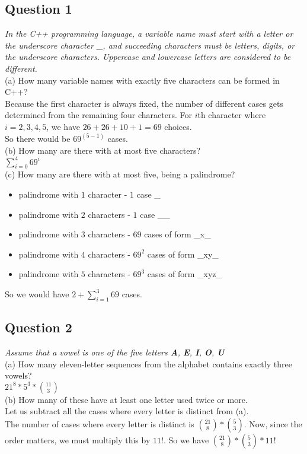 \documentclass{article}
\begin{document}
\subsection{Question 1}
\smallskip
\emph{In the C++ programming language, a variable name must start with a letter or the underscore character \_, and succeeding characters must be letters, digits, or the underscore characters. Uppercase and lowercase letters are considered to be different.}
\bigskip
\\
(a) How many variable names with exactly five characters can be formed in C++?
\medskip
\\
Because the first character is always fixed, the number of different cases gets determined from the remaining four characters. For $i$th character where $i=2,3,4,5$, we have $26+26+10+1 = 69$ choices.
\smallskip
\\
So there would be $69^{(5-1)}$ cases.
\bigskip
\\
(b) How many are there with at most five characters?
\medskip
\\
$\sum_{i=0}^4 69^i$
\bigskip
\\
(c) How many are there with at most five, being a palindrome?
\medskip
\begin{itemize}
    \item palindrome with $1$ character - $1$ case \_
    \item palindrome with $2$ characters - $1$ case \_\_
    \item palindrome with $3$ characters - $69$ cases of form  \_x\_
    \item palindrome with $4$ characters - $69^2$ cases of form \_xy\_
    \item palindrome with $5$ characters - $69^3$ cases of form \_xyz\_
\end{itemize}
So we would have $2 + \sum_{i=1}^3 69$ cases.
\smallskip
\\
\subsection{Question 2}
\smallskip
\emph{Assume that a vowel is one of the five letters \textbf{A}, \textbf{E}, \textbf{I}, \textbf{O}, \textbf{U}}
\bigskip
\\
(a) How many eleven-letter sequences from the alphabet contains exactly three vowels?
\medskip
\\
$21^8 * 5^3 * {11 \choose 3} $
\bigskip
\\
(b) How many of these have at least one letter used twice or more.
\medskip
\\
Let us subtract all the cases where every letter is distinct from (a).
\smallskip
\\
The number of cases where every letter is distinct is ${21\choose8} * {5\choose3}$. Now, since the order matters, we must multiply this by $11!$. So we have ${21\choose8} * {5\choose3} * 11!$
\end{document}
